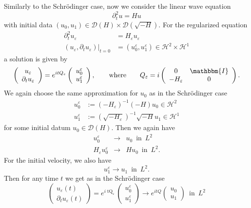 \documentclass[11pt, oneside]{article}   	%
\newcommand{\assign}{:=}
\newcommand{\tmop}[1]{\ensuremath{\operatorname{#1}}}
\newcommand{\ssp}{\mathscr{H}}
\begin{document}
Similarly to the Schr{\"o}dinger case, now we consider  the linear wave equation
\[ \partial^2_t u = H u \]
with initial data $(u_0, u_1) \in \mathscr{D} (H) \times
\mathscr{D} ( \sqrt{- H} ) .$
For the regularized equation
\begin{align*}
\partial^2_t u_{\varepsilon} & =  H_{\varepsilon} u_{\varepsilon}\\
(u_{\varepsilon}, \partial_t u_{\varepsilon}) |_{t = 0} & = 
(u^{\varepsilon}_0, u^{\varepsilon}_1) \in \ssp^2 \times \ssp^1
\end{align*}
a solution is given by
\[ \left(\begin{array}{c}
u_{\varepsilon}\\
\partial_t u_{\varepsilon}
\end{array}\right) = e^{i t Q_{\varepsilon}} \left(\begin{array}{c}
u^{\varepsilon}_0\\
u_1^{\varepsilon}
\end{array}\right),\qquad\text{where}\qquad Q_{\varepsilon} = i \left(\begin{array}{cc}
0 & \mathbbm{I}\\
- H_{\varepsilon} & 0
\end{array}\right).
 \] We again choose the same approximation for $u_0$ as in
the Schr{\"o}dinger case
\begin{align*}
u^{\varepsilon}_0 & \assign (- H_{\varepsilon})^{- 1}(-H) u_0 \in
\ssp^2 \\
u^{\varepsilon}_1 & \assign (\sqrt{- H_{\varepsilon}})^{- 1}\sqrt{-H} u_1 \in
\ssp^1
\end{align*}
for some initial datum $u_0 \in \mathscr{D} (H) .$ Then we again have
\begin{eqnarray*}
	u^{\varepsilon}_0 & \rightarrow & u_0 \ \tmop{in} \ L^2\\
	H_{\varepsilon} u^{\varepsilon}_0 & \rightarrow & H u_0 \ \tmop{in} \ L^2.
\end{eqnarray*}
For the initial velocity, we also have 
\[ u^{\varepsilon}_1 \rightarrow u_1  \ \tmop{in} \  L^2 . \]
Then for any time $t$ we get as in the Schr{\"o}dinger case
\[ \left(\begin{array}{c}
u_{\varepsilon} (t)\\
\partial_t u_{\varepsilon} (t)
\end{array}\right) = e^{i \tmop{tQ}_{\varepsilon}} \left(\begin{array}{c}
u^{\varepsilon}_0\\
u^{\varepsilon}_1
\end{array}\right) \rightarrow e^{i t Q} \left(\begin{array}{c}
u_0\\
u_1
\end{array}\right) \ \tmop{in} \  L^2 \]
\end{document}
